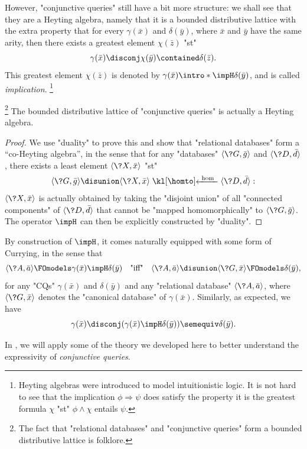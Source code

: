 However, "conjunctive queries" still have a bit more structure: we shall
see that they are a Heyting algebra, namely that it is a bounded distributive lattice
with the extra property that for every $\gamma(\bar x)$ and $\delta(\bar y)$,
where $\bar x$ and $\bar y$ have the same arity, then there exists
a greatest element $\chi(\bar z)$ "st"
\[
	\gamma(\bar x) \disconj \chi(\bar y) \contained \delta(\Bar z). 
\]
This greatest element $\chi(\bar z)$ is denoted by \AP$\gamma(\bar x) \intro*\impH \delta(\bar y)$, and is called \emph{implication}.%
\footnote{Heyting algebras were introduced to model intuitionistic logic.
It is not hard to see that the implication $\phi \Rightarrow \psi$
does satisfy the property it is the greatest formula $\chi$
"st" $\phi \land \chi$ entails $\psi$.}

\begin{proposition}
	\!\footnote{The fact that "relational databases" and "conjunctive queries" form
	a bounded distributive lattice is folklore.}
	The bounded distributive lattice of "conjunctive queries" is actually
	a Heyting algebra.
\end{proposition}

\begin{proof}
	We use "duality" to prove this and show that "relational databases" form a ``co-Heyting algebra'',
	in the sense that for any "databases" $\tup{\?G, \bar g}$ and $\tup{\?D, \bar d}$,
	there exists a least element $\tup{\?X, \bar x}$ "st"
	\[
		\tup{\?G, \bar g} \disunion \tup{\?X, \bar x} \cohomto \tup{\?D, \bar d}:
	\]
	$\tup{\?X, \bar x}$ is actually obtained by taking the "disjoint union"
	of all "connected components" of $\tup{\?D, \bar d}$ 
	that cannot be "mapped homomorphically" to $\tup{\?G, \bar g}$.
	The operator $\impH$ can then be explicitly constructed by "duality".
\end{proof}

By construction of $\impH$, it comes naturally equipped with some
form of Currying, in the sense that
\[
	\tup{\?A, \bar a}
	\FOmodels \gamma(\bar x) \impH \delta(\bar y)
	\quad\text{"iff"}\quad
	\tup{\?A, \bar a} \disunion \tup{\?G, \bar x}
	\FOmodels \delta(\bar y),
\]
for any "CQs" $\gamma(\bar x)$ and $\delta(\bar y)$
and any "relational database" $\tup{\?A, \bar a}$,
where $\tup{\?G, \bar x}$ denotes the "canonical database" of $\gamma(\bar x)$.
Similarly, as expected, we have
\[
	\gamma(\bar x) \disconj (\gamma(\bar x) \impH \delta(\bar y))
	\semequiv
	\delta(\bar y).
\]

In ,
we will apply some of the theory we developed here
to better understand the expressivity of \emph{conjunctive queries}.

